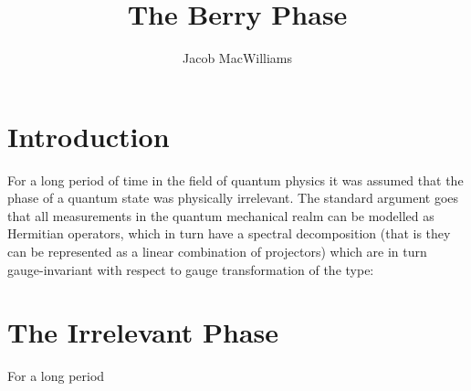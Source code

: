 \documentclass{article}
\title{The Berry Phase}
\author{Jacob MacWilliams}
\begin{document}
\section{Introduction}

For a long period of time in the field of quantum physics it was assumed that the phase of a quantum state was physically irrelevant. The standard argument goes that all measurements in the quantum mechanical realm can be modelled as Hermitian operators, which in turn have a spectral decomposition (that is they can be represented as a linear combination of projectors) which are in turn gauge-invariant with respect to gauge transformation of the type:
\section{The Irrelevant Phase}

For a long period 
\end{document}
